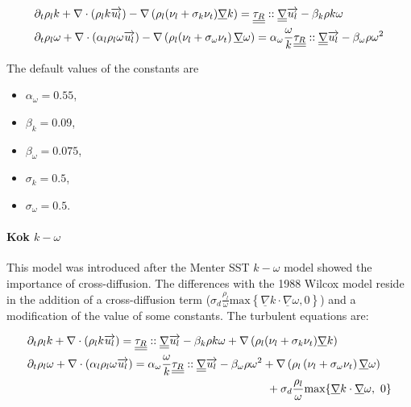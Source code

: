 \begin{align}
		&\partial_t \rho_l k + \nabla \cdot ( \rho_l k \overrightarrow{u_l}) -
		\nabla\left(  \rho_l(\nu_l + \sigma_k \nu_t) \underline{\nabla} k \right) =
		  \underline{\underline{\tau_R}}::\underline{\underline{\nabla}}\overrightarrow{u_l}
		 - \beta_{k}\rho k \omega
		\\
		&\partial_t  \rho_l \omega + \nabla \cdot \left( \alpha_l \rho_l \omega \overrightarrow{u_l} \right) - \nabla\left( \rho_l(\nu_l + \sigma_{\omega} \nu_t \right) \underline{\nabla} \omega) =
		 \alpha_{\omega}  \frac{\omega}{k}\underline{\underline{\tau_R}}::\underline{\underline{\nabla}}\overrightarrow{u_l}
		 - \beta_{\omega}\rho \omega^2
\end{align}

The default values of the constants are
\begin{itemize}
    \item $\alpha_{\omega} = 0.55$,
    \item $\beta_{k} = 0.09$,
    \item $\beta_{\omega} = 0.075$,
    \item $\sigma_k = 0.5$,
    \item $\sigma_{\omega} = 0.5$.
\end{itemize}

\paragraph{Kok $k-\omega$}\mbox{}

This model \cite{Kok1999} was introduced after the Menter SST $k-\omega$ model \cite{Menter1993, Menter2003} showed the importance of cross-diffusion. The differences with the 1988 Wilcox model reside in the addition of a cross-diffusion term (${ \sigma_d\frac{  \rho_l}{\omega} } \text{max}\left\{{\underline{\nabla}k \cdot \underline{\nabla} \omega}, 0\right\}  $) and a modification of the value of some constants. The turbulent equations are:

\begin{align}
	\label{eq_omega_Kok}
		&\partial_t \rho_l k + \nabla \cdot \parent{\rho_l k \vec{u_l}} =
		\underline{\underline{\tau_R}}::\underline{\underline{\nabla}}\vec{u_l}
		 - \beta_{k}\rho k \omega
		+ \nabla\parent{\rho_l(\nu_l + \sigma_k \nu_t) \underline{\nabla} k}
		\\
		&\begin{multlined}
		\partial_t  \rho_l \omega + \nabla \cdot \parent{\alpha_l \rho_l \omega \vec{u_l}} =
		 \alpha_{\omega} \frac{\omega}{k}\underline{\underline{\tau_R}}::\underline{\underline{\nabla}}\vec{u_l}
		 - \beta_{\omega}\rho \omega^2
		 +\nabla\parent{\rho_l\parent{\nu_l + \sigma_{\omega}\nu_t} \underline{\nabla} \omega} \\
		 + \sigma_d\frac{\rho_l}{\omega} \text{max}\acco{\underline{\nabla}k \cdot \underline{\nabla} \omega,\ 0}
		\end{multlined}
\end{align}

